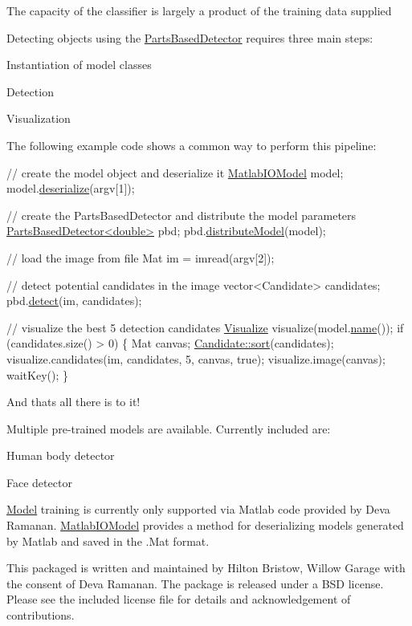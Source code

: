 The capacity of the classifier is largely a product of the training data supplied

Detecting objects using the \hyperlink{classPartsBasedDetector}{Parts\+Based\+Detector} requires three main steps\+:
\begin{DoxyItemize}
\item Instantiation of model classes
\item Detection
\item Visualization
\end{DoxyItemize}

The following example code shows a common way to perform this pipeline\+: 
\begin{DoxyCode}
\textcolor{comment}{// create the model object and deserialize it}
\hyperlink{classMatlabIOModel}{MatlabIOModel} model;
model.\hyperlink{classMatlabIOModel_a223538821bf7944a26433f7f99017f8b}{deserialize}(argv[1]);

\textcolor{comment}{// create the PartsBasedDetector and distribute the model parameters}
\hyperlink{classPartsBasedDetector}{PartsBasedDetector<double>} pbd;
pbd.\hyperlink{classPartsBasedDetector_a351a499cb2d7ab23d388a34c1c8f38a0}{distributeModel}(model);

\textcolor{comment}{// load the image from file}
Mat im = imread(argv[2]);

\textcolor{comment}{// detect potential candidates in the image}
vector<Candidate> candidates;
pbd.\hyperlink{classPartsBasedDetector_a70c77effade6c39b06ddc0102973a1f8}{detect}(im, candidates);

\textcolor{comment}{// visualize the best 5 detection candidates}
\hyperlink{classVisualize}{Visualize} visualize(model.\hyperlink{classModel_aeae6527ff13db7724c53c942029d882d}{name}());
\textcolor{keywordflow}{if} (candidates.size() > 0) \{
 Mat canvas;
    \hyperlink{classCandidate_a7e0776d9b8b7496d49f46298e93d0271}{Candidate::sort}(candidates);
    visualize.candidates(im, candidates, 5, canvas, \textcolor{keyword}{true});
    visualize.image(canvas);
    waitKey();
\}
\end{DoxyCode}


And that\textquotesingle{}s all there is to it!

Multiple pre-\/trained models are available. Currently included are\+:
\begin{DoxyItemize}
\item Human body detector
\item Face detector
\end{DoxyItemize}

\hyperlink{classModel}{Model} training is currently only supported via Matlab code provided by Deva Ramanan. \hyperlink{classMatlabIOModel}{Matlab\+I\+O\+Model} provides a method for deserializing models generated by Matlab and saved in the .Mat format. 



This packaged is written and maintained by Hilton Bristow, Willow Garage with the consent of Deva Ramanan. The package is released under a B\+S\+D license. Please see the included license file for details and acknowledgement of contributions. 